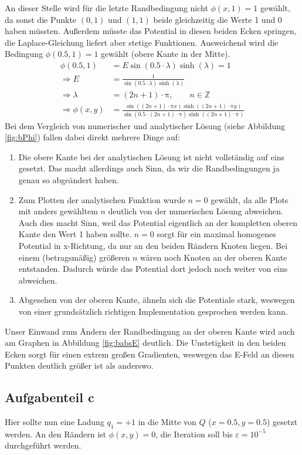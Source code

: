 An dieser Stelle wird für die letzte Randbedingung nicht $\phi(x,1) = 1$ gewählt, da sonst die Punkte $(0,1)$ und $(1,1)$ beide gleichzeitig die Werte 1 und 0 haben müssten.
Außerdem müsste das Potential in diesen beiden Ecken springen, die Laplace-Gleichung liefert aber stetige Funktionen.
Ausweichend wird die Bedingung $\phi(0.5,1) = 1$ gewählt (obere Kante in der Mitte).
\begin{align*}
    \phi(0.5,1) &= E\sin(0.5\cdot\lambda)\sinh(\lambda) = 1 \\
    \Rightarrow E &= \frac{1}{\sin(0.5\cdot\lambda)\sinh(\lambda)} \\
    \Rightarrow \lambda &= (2n+1)\cdot\mathup{\pi}, \qquad n\in\mathbb{Z} \\
    \Rightarrow \phi(x,y) &= \frac{\sin((2n+1)\cdot\mathup{\pi} x)\sinh((2n+1)\cdot\mathup{\pi} y)}{\sin(0.5\cdot(2n+1)\cdot\mathup{\pi})\sinh((2n+1)\cdot\mathup{\pi})}
\end{align*}
Bei dem Vergleich von numerischer und analytischer Lösung (siehe Abbildung \ref{fig:bPhi}) fallen dabei direkt mehrere Dinge auf:
\begin{enumerate}
    \item Die obere Kante bei der analytischen Lösung ist nicht vollständig auf eins gesetzt.
    Das macht allerdings auch Sinn, da wir die Randbedingungen ja genau so abgeändert haben.
    \item Zum Plotten der analytischen Funktion wurde $n = 0$ gewählt, da alle Plots mit anders gewähltem $n$ deutlich von der numerischen Lösung abweichen.
    Auch dies macht Sinn, weil das Potential eigentlich an der kompletten oberen Kante den Wert 1 haben sollte.
    $n = 0$ sorgt für ein maximal homogenes Potential in x-Richtung, da nur an den beiden Rändern Knoten liegen.
    Bei einem (betragsmäßig) größeren $n$ wären noch Knoten an der oberen Kante entstanden.
    Dadurch würde das Potential dort jedoch noch weiter von eins abweichen.
    \item Abgesehen von der oberen Kante, ähneln sich die Potentiale stark, weswegen von einer grundsätzlich richtigen Implementation gesprochen werden kann.
\end{enumerate}
Unser Einwand zum Ändern der Randbedingung an der oberen Kante wird auch am Graphen in Abbildung \ref{fig:babsE} deutlich.
Die Unstetigkeit in den beiden Ecken sorgt für einen extrem großen Gradienten, weswegen das E-Feld an diesen Punkten deutlich größer ist als anderswo.
\subsection*{Aufgabenteil c}
Hier sollte nun eine Ladung $q_1 = +1$ in die Mitte von $Q$ ($x=0.5, y=0.5$) gesetzt werden. An den Rändern ist $\phi(x,y) = 0$, die Iteration soll bis $\varepsilon = 10^{-5}$ durchgeführt werden.

